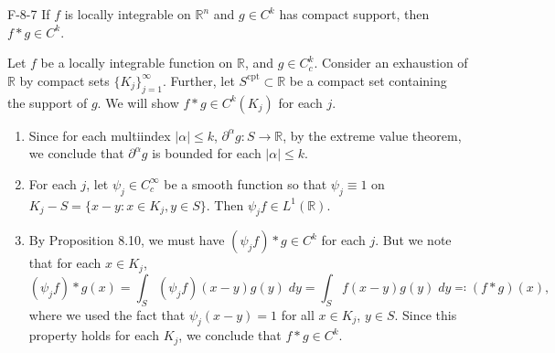 \documentclass{article}
\begin{document}
		\begin{prb}{F-8-7}
		If $f$ is locally integrable on $\mathbb{R}^{n}$ and $g \in C^{k}$ has compact support, then $f \ast g \in C^{k}$. 
	\end{prb}
	Let $f$ be a locally integrable function on $\mathbb{R}$, and $g \in C_{c}^{k}$. Consider an exhaustion of $\mathbb{R}$ by compact sets $\{K_{j}\}_{j = 1}^{\infty}$. Further, let $S^{\text{cpt}} \subset \mathbb{R}$ be a compact set containing the support of $g$. We will show $f \ast g \in C^{k}(K_{j})$ for each $j$. \vspace{-0.25cm}
	\begin{enumerate}[itemsep =-2pt,label = (\roman{*})]
		\item Since for each multiindex $|\alpha|\leq k$, $\partial^{\alpha}g: S \to \mathbb{R}$, by the extreme value theorem, we conclude that $\partial^{\alpha}g$ is bounded for each $|\alpha|\leq k$. 
		\item For each $j$, let $\psi_{j} \in C_{c}^{\infty}$ be a smooth function so that $\psi_{j} \equiv 1$ on $K_{j} - S = \{x - y: x\in K_{j}, y \in S\}$. Then $\psi_{j}f \in L^{1}(\mathbb{R})$. 
		\item By Proposition 8.10, we must have $(\psi_{j}f) \ast g \in C^{k}$ for each $j$. But we note that for each $x \in K_{j}$, 
		\begin{equation}
			(\psi_{j}f)\ast g(x) = \int_{S}(\psi_{j}f)(x-y)g(y)\;dy = \int_{S}f(x-y)g(y)\;dy \eqqcolon (f \ast g)(x), 
		\end{equation}
		where we used the fact that $\psi_{j}(x-y) = 1$ for all $x \in K_{j}$, $y \in S$. Since this property holds for each $K_{j}$, we conclude that $f \ast g \in C^{k}$. 
	\end{enumerate}
	
\end{document}
